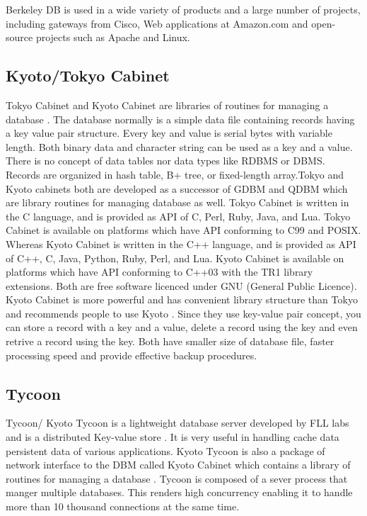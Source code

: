 {     Berkeley DB is used in a wide variety of products and a large
     number of projects, including gateways from Cisco, Web
     applications at Amazon.com and open-source projects such as
     Apache and Linux.

     \pv

\subsection{Kyoto/Tokyo Cabinet \cv}

     Tokyo Cabinet and Kyoto Cabinet are libraries
     of routines for managing
     a database \cite{www-tokyo-cabinet} \cite{www-kyoto-cabinet}.
     The database normally is a simple data file
     containing records having a key value pair structure. Every key
     and value is serial bytes with variable length. Both binary data
     and character string can be used as a key and a value. There is
     no concept of data tables nor data types like RDBMS or
     DBMS. Records are organized in hash table, B+ tree, or
     fixed-length array.Tokyo and Kyoto cabinets both are developed as
     a successor of GDBM and QDBM which are library routines for
     managing database as well. Tokyo Cabinet is written in the C
     language, and is provided as API of C, Perl, Ruby, Java, and
     Lua. Tokyo Cabinet is available on platforms which have API
     conforming to C99 and POSIX. Whereas Kyoto Cabinet is written in
     the C++ language, and is provided as API of C++, C, Java, Python,
     Ruby, Perl, and Lua. Kyoto Cabinet is available on platforms
     which have API conforming to C++03 with the TR1 library
     extensions. Both are free software licenced under GNU (General
     Public Licence). Kyoto Cabinet is more powerful and has convenient library
     structure than Tokyo and recommends
     people to use Kyoto \cite{www-tokyo-cabinet}. Since
     they use key-value pair concept, you can store a record with a
     key and a value, delete a record using the key and even retrive a
     record using the key. Both have smaller size of database file,
     faster processing speed and provide effective backup procedures.

     \pv

     
\subsection{Tycoon}

     Tycoon/ Kyoto Tycoon is a lightweight
     database server developed by FLL labs and is a distributed
     Key-value store \cite{www-cloufare-tycoon} \cite{www-fallabs-tycoon}.
     It is very useful in
     handling cache data persistent data of various
     applications. Kyoto Tycoon is also a package of network interface
     to the DBM called Kyoto Cabinet which
     contains a library of routines for managing a
     database \cite{www-fallabs-kyoto}. Tycoon is
     composed of a sever process that manger multiple databases. This
     renders high concurrency enabling it to handle more than 10
     thousand connections at the same time.

}
